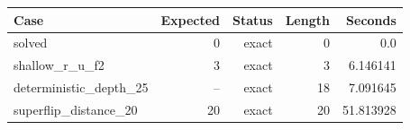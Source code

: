 {\small
\begin{tabular}{lrrrr}
\hline
Case & Expected & Status & Length & Seconds \\
\hline
solved & 0 & exact & 0 & 0.0 \\
shallow\_r\_u\_f2 & 3 & exact & 3 & 6.146141 \\
deterministic\_depth\_25 & -- & exact & 18 & 7.091645 \\
superflip\_distance\_20 & 20 & exact & 20 & 51.813928 \\
\hline
\end{tabular}
}
